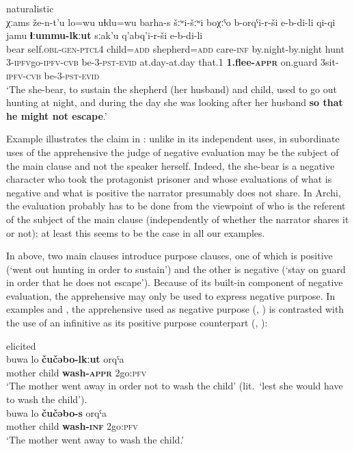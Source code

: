 \documentclass[output=paper,colorlinks,citecolor=brown]{langscibook}
\begin{document}
\ea \label{ex:DD13} \textnormal{naturalistic} \\
\gll χːams že-n-t'u lo=wu uɬdu=wu barha-s šːʷi-šːʷi boχːˤo b-o{\textlangle}r{\textrangle}qˤi-r-ši e-b-di-li qi-qi jamu \textbf{ɬːummu-lkːut} sːak'u q'a{\textlangle}b{\textrangle}q'i-r-ši e-b-di-li\\
bear self.\textsc{obl-gen-ptcl4} child=\textsc{add} shepherd=\textsc{add} care-\textsc{inf} by.night-by.night hunt 3-{\textlangle}\textsc{ipfv}{\textrangle}go-\textsc{ipfv-cvb} be-3-\textsc{pst-evid} at.day-at.day that.1 \textbf{1.flee-\textsc{appr}} on.guard {\textlangle}3{\textrangle}sit-\textsc{ipfv-cvb} be-3-\textsc{pst-evid}\\
\glt `The she-bear, to sustain the shepherd (her husband) and child, used to go out hunting at night, and during the day she was looking after her husband \textbf{so that he might not escape}.'
\z

\noindent Example  illustrates the claim in \citet{vuillermet2018a}: unlike in its independent uses, in subordinate uses of the apprehensive the judge of negative evaluation may be the subject of the main clause and not the speaker herself. Indeed, the she-bear is a negative character who took the protagonist prisoner and whose evaluations of what is negative and what is positive the narrator presumably does not share. In Archi, the evaluation probably has to be done from the viewpoint of who is the referent of the subject of the main clause (independently of whether the narrator shares it or not); at least this seems to be the case in all our examples. 

In  above, two main clauses introduce purpose clauses, one of which is positive (`went out hunting in order to sustain') and the other is negative (`stay on guard in order that he does not escape'). Because of its built-in component of negative evaluation, the apprehensive may only be used to express negative purpose. In examples  and , the apprehensive used as negative purpose (, ) is contrasted with the use of an infinitive as its positive purpose counterpart (, ):
 

\ea \label{ex:DD14} \textnormal{elicited} \\
\ea \label{ex:DD14a}
\gll buwa lo \textbf{čučəbo-lkːut} o{\textlangle}r{\textrangle}qˤa \\
mother child \textbf{wash-\textsc{appr}} {\textlangle}2{\textrangle}go:\textsc{pfv} \\
\glt `The mother went away in order not to wash the child' (lit.\ `lest she would have to wash the child'). \\
\ex \label{ex:DD14b}
\gll buwa lo \textbf{čučəbo-s} o{\textlangle}r{\textrangle}qˤa \\
mother child \textbf{wash-\textsc{inf}} {\textlangle}2{\textrangle}go:\textsc{pfv} \\
\glt `The mother went away to wash the child.'
\z
\z
\end{document}
